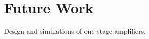 \documentclass[10pt, conference,a4paper]{IEEEtran}
\begin{document}
\begin{comment}  

Inserir quando tiver desenvolvendo amplificadores de 2 estágios
Ruído Térmico
M1 é o NMOS e M2 é o PMOS
\begin{equation}
    v_{n,in}^2(f) \approx \frac{4kT\lambda}{g_{m1}} \left (1 + \frac{g_{m2}}{g_{m1}} \right)
\end{equation}
\end{comment}




\begin{comment}
\subsection{Largura de banda}
Acho que a equação \ref{eq:bw} é da largura de banda.

\begin{equation}
    BW = \frac{\omega_p}{2\pi} = \frac{\omega_p}{2\pi r_o C_L}
    \label{eq:bw}
\end{equation}

Já a equação \ref{eq:gbw}

\begin{equation}
    GBW = \left | A_v \right | B_w = f_u = \frac{g_m}{2 \pi C_L}
    \label{eq:gbw}
\end{equation}
\end{comment}




\section{Future Work}
Design and simulations of one-stage amplifiers. 

\end{document}
